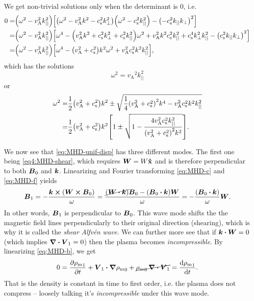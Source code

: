 \documentclass[11pt,a4paper, 
swedish, english %
]{article}
\newcommand{\rhom}{\ensuremath{{\rho_{\text{m}}}}}
\newcommand{\vA}{\ensuremath{v_{\text{A}}}}
\newcommand{\cs}{\ensuremath{c_{\text{s}}}}
\begin{document}
We get non-trivial solutions only when the determinant is 0, i.e.
\begin{equation}
\begin{aligned}
0=&\qty(\omega^2-\vA^2k_{||}^2)\qty[
\qty(\omega^2-\vA^2k^2-\cs^2k_\perp^2)\qty(\omega^2 -\cs^2k_{||}^2)
-\qty(-\cs^2k_{||}k_\perp)^2]\\
=&\qty(\omega^2-\vA^2k_{||}^2)\qty[\omega^4-
\qty(\vA^2k^2+\cs^2k_\perp^2+\cs^2k_{||}^2)\omega^2
+\vA^2k^2\cs^2k_{||}^2
+\cs^4k_\perp^2k_{||}^2-\qty(\cs^2k_{||}k_\perp)^2]\\
=&\qty(\omega^2-\vA^2k_{||}^2)\qty[
\omega^4-\qty(\vA^2+\cs^2)k^2\omega^2
+\vA^2\cs^2k^2k_{||}^2],
\end{aligned}
\end{equation}
which has the solutions
\begin{equation}\label{eq4:MHD-shear}
\omega^2=\vA^2k_{||}^2
\end{equation}
or
\begin{equation}
\begin{aligned}
\omega^2=&\frac{1}{2}\qty(\vA^2+\cs^2)k^2
\pm\sqrt{\frac{1}{4}\qty(\vA^2+\cs^2)^2k^4
-\vA^2\cs^2k^2k_{||}^2}\\
=&\frac{1}{2}\qty(\vA^2+\cs^2)k^2\qty[
1\pm\sqrt{1-\frac{4\vA^2\cs^2k_{||}^2}{\qty(\vA^2+\cs^2)^2k^2}}].
\end{aligned}
\end{equation}

We now see that \eqref{eq:MHD-unif-disp} has three different
modes. The first one being \eqref{eq4:MHD-shear}, which requires
$\vb*W=W\vu{x}$ and is therefore perpendicular to both $\vb*B_0$ and
$\vb*k$. Linearizing and Fourier transforming \eqref{eq:MHD-c} and
\eqref{eq:MHD-f} yields
\begin{equation}
\vb*B_1 = -\frac{\vb*k\cross(\vb*W\cross\vb*B_0)}{\omega}
=\frac{\cancel{(\vb*W\vdot\vb*k)}\vb*B_0
-(\vb*B_0\vdot\vb*k)\vb*W}{\omega}
=-\frac{(\vb*B_0\vdot\vb*k)}{\omega}\vb*W.
\end{equation}
In other words, $\vb*B_1$ is perpendicular to $\vb*B_0$. This wave
mode shifts the the magnetic field lines perpendicularly to their
original direction (shearing), which is why it is called the
\emph{shear Alfvén wave}. We can further more see that 
if $\vb*k\vdot\vb*W=0$ (which implies $\div\vb*V_1=0$) then the plasma
becomes \emph{incompressible}. By linearizing \eqref{eq:MHD-b}, we get  
\begin{equation}
0=\pdv{\rhom_1}{t} + \vb*V_1\vdot\grad\rhom_0
+\cancel{\rhom_0\,\div\vb*V_1}
=\dv{\rhom_1}{t}.
\end{equation}
That is the density is constant in time to first order, i.e. the
plasma does not compress -- loosely talking it's \emph{incompressible}
under this wave mode. 
\end{document}
